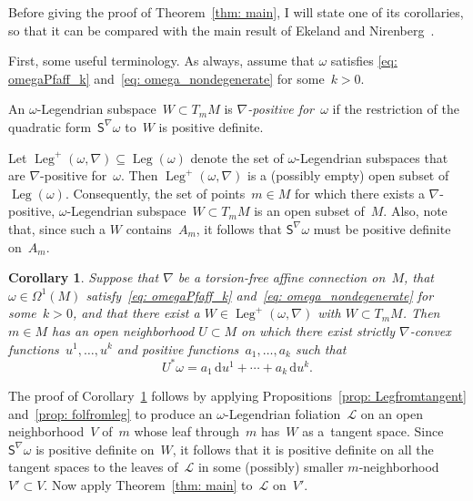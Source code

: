\documentclass[10pt,a4paper]{amsart}
\renewcommand{\d}{\mathrm{d}}%
\newcommand{\cL}{{\mathcal L}}
\newcommand{\Leg}{\operatorname{Leg}}
\newcommand{\Ss}{\mathsf{S}}
\numberwithin{equation}{section}
\newtheorem{Corollary}[Theorem]{Corollary}
\begin{document}
Before giving the proof of Theorem~\ref{thm: main},
I will state one of its corollaries, so that it can be compared
with the main result of Ekeland and Nirenberg~\cite[Theorem 1]{MR2023129}.

First, some useful terminology.
As always, assume that $\omega$ satisfies
\eqref{eq: omegaPfaff_k} and~\eqref{eq: omega_nondegenerate} for some~${k>0}$.

\begin{Definition} An $\omega$-Legendrian subspace~$W\subset T_mM$
is \emph{$\nabla$-positive for~$\omega$}
if the restriction of the quadratic form~$\Ss^\nabla\omega$ to~$W$
is positive definite.
\end{Definition}

Let $\Leg^+(\omega,\nabla)\subseteq\Leg(\omega)$
denote the set of $\omega$-Legendrian subspaces
that are $\nabla$-positive for~$\omega$.
Then $\Leg^+(\omega,\nabla)$ is a (possibly empty) open subset
of~$\Leg(\omega)$. Consequently, the set of points~$m\in M$
for which there exists a $\nabla$-positive, $\omega$-Legendrian
subspace~$W\subset T_mM$ is an open subset of~$M$.
Also, note that, since such a $W$ contains~$A_m$,
it follows that $\Ss^\nabla\omega$ must be positive definite on~$A_m$.



\begin{Corollary}\label{cor: main}
Suppose that $\nabla$ be a torsion-free affine
connection on~$M$, that $\omega\in\Omega^1(M)$
satisfy~\eqref{eq: omegaPfaff_k} and~\eqref{eq: omega_nondegenerate}
for some~$k>0$, and that there exist a $W\in\Leg^+(\omega,\nabla)$
with ${W\subset T_mM}$. Then $m\in M$ has an open neighborhood ${U\subset M}$
on which there exist strictly $\nabla$-convex functions~$u^1,\ldots,u^k$
and positive functions~$a_1,\ldots,a_k$ such that
\begin{equation*}
U^*\omega = a_1\,\d u^1 + \cdots + a_k\,\d u^k.
\end{equation*}
\end{Corollary}

The proof of Corollary~\ref{cor: main} follows
by applying Propositions~\ref{prop: Legfromtangent}
and~\ref{prop: folfromleg} to produce an $\omega$-Legendrian foliation~$\cL$
on an open neighborhood~$V$ of~$m$ whose leaf through~$m$ has~$W$
as a~tangent space. Since $\Ss^\nabla\omega$ is positive definite on~$W$,
it follows that it is positive definite on all the tangent spaces
to the leaves of~$\cL$
in some (possibly) smaller $m$-neighborhood~$V'\subset V$.
Now apply Theorem~\ref{thm: main} to~$\cL$ on~$V'$.
\end{document}
